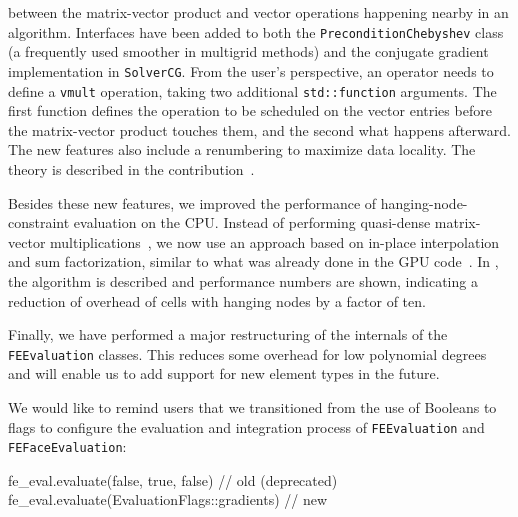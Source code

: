 \documentclass{ansarticle-preprint}
\begin{document}
\begin{itemize}
  between the matrix-vector product and vector operations happening nearby in
  an algorithm. Interfaces have been added to both the
  \texttt{PreconditionChebyshev} class (a frequently used smoother in multigrid
  methods) and the conjugate gradient implementation in \texttt{SolverCG}.
  From the user's perspective, an operator needs to define a \texttt{vmult} operation,
  taking two additional \texttt{std::function} arguments. The first function
  defines the operation to be scheduled on the vector entries before the
  matrix-vector product touches them, and the second what happens
  afterward. The new features also include a renumbering to maximize data
  locality. The theory is described in the
  contribution~\cite{kronbichler2022cg}.
\end{itemize}
Besides these new features, we improved the performance of
hanging-node-constraint evaluation on the CPU. Instead of performing
quasi-dense matrix-vector multiplications~\cite{KronbichlerKormann2012}, we now use an
approach based on in-place interpolation and sum factorization, similar
to what was already done in the GPU code~\cite{ljungkvist2017matrix}. In \cite{munch2022hn}, the algorithm is described
and performance numbers are shown, indicating a reduction
of overhead of cells with hanging nodes by a factor of ten.

Finally, we have performed a major restructuring of the internals
of the \texttt{FEEvaluation} classes. This reduces some overhead for low polynomial degrees and will enable us to add support for new element types in the future.

We would like to remind users that we transitioned from the use of Booleans
to flags to configure the evaluation and integration process of \texttt{FEEvaluation}
and \texttt{FEFaceEvaluation}:

\begin{c++}
fe_eval.evaluate(false, true, false)         // old (deprecated)
fe_eval.evaluate(EvaluationFlags::gradients) // new
\end{c++}

%
%
%
%
%
\end{document}
